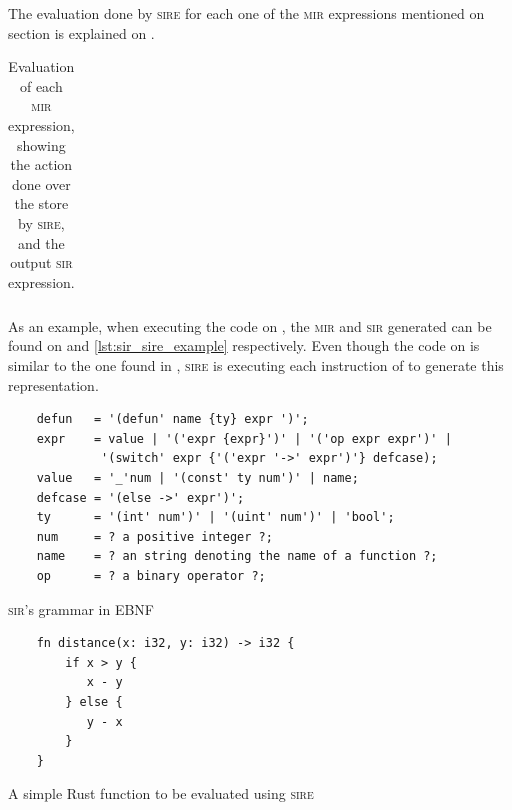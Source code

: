The evaluation done by \textsc{sire} for each one of the \textsc{mir}
expressions mentioned on section  is explained
on .

\begin{table}[ht]
    \centering
    \begin{tabular}{ | c | c | c | }
    \end{tabular}
    \caption{Evaluation of each \textsc{mir} expression, showing the action
    done over the store by \textsc{sire}, and the output \textsc{sir}
    expression. }
  \label{tab:sire_table}
\end{table}


As an example, when executing the code on , the
\textsc{mir} and \textsc{sir} generated can be found on
 and \ref{lst:sir_sire_example} respectively. Even
though the code on  is similar to the one found in
, \textsc{sire} is executing each instruction of
 to generate this representation.

\begin{listing}[ht]
    \begin{verbatim}
    defun   = '(defun' name {ty} expr ')';
    expr    = value | '('expr {expr}')' | '('op expr expr')' | 
             '(switch' expr {'('expr '->' expr')'} defcase);
    value   = '_'num | '(const' ty num')' | name;
    defcase = '(else ->' expr')';
    ty      = '(int' num')' | '(uint' num')' | 'bool';
    num     = ? a positive integer ?;
    name    = ? an string denoting the name of a function ?;
    op      = ? a binary operator ?;
    \end{verbatim}
    \caption{\textsc{sir}'s grammar in EBNF}
  \label{lst:sir_grammar}
\end{listing}

\begin{listing}[ht]
    \begin{verbatim}
    fn distance(x: i32, y: i32) -> i32 {
        if x > y {
           x - y
        } else {
           y - x
        }
    }
    \end{verbatim}
    \caption{A simple Rust function to be evaluated using \textsc{sire}}
  \label{lst:rust_sire_example}
\end{listing}

